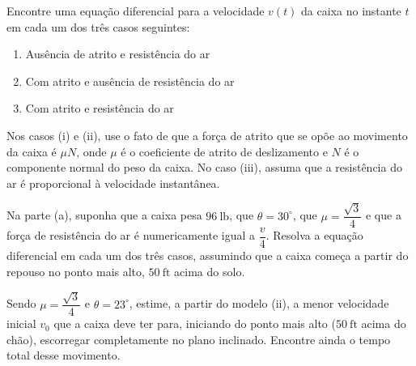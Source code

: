 \documentclass[oneside,12pt,a4paper]{report}
\begin{document}
    \begin{itensquestao}
        \item Encontre uma equação diferencial para a velocidade $v(t)$ da caixa no instante $t$ em cada um dos três casos seguintes:
        \begin{enumerate}[label=\roman*)]
            \item Ausência de atrito e resistência do ar
            \item Com atrito e ausência de resistência do ar
            \item Com atrito e resistência do ar
        \end{enumerate}
        Nos casos (i) e (ii), use o fato de que a força de atrito que se opõe ao movimento da caixa é $\mu N$, onde $\mu$ é o coeficiente de atrito de deslizamento e $N$ é o componente normal do peso da caixa. No caso (iii), assuma que a resistência do ar é proporcional à velocidade instantânea.

        \item Na parte (a), suponha que a caixa pesa $96~\mathrm{lb}$, que $\theta=30^\circ$, que $\mu=\dfrac{\sqrt{3}}{4}$ e que a força de resistência do ar é numericamente igual a $\dfrac{v}{4}$. Resolva a equação diferencial em cada um dos três casos, assumindo que a caixa começa a partir do repouso no ponto mais alto, $50~\mathrm{ft}$ acima do solo.
        
        \item Sendo $\mu=\dfrac{\sqrt{3}}{4}$ e $\theta=23^\circ$, estime, a partir do modelo (ii), a menor velocidade inicial $v_0$ que a caixa deve ter para, iniciando do ponto mais alto ($50~\mathrm{ft}$ acima do chão), escorregar completamente no plano inclinado. Encontre ainda o tempo total desse movimento.
    \end{itensquestao}

    \begin{resolucao}
        
    \end{resolucao}
\end{document}
